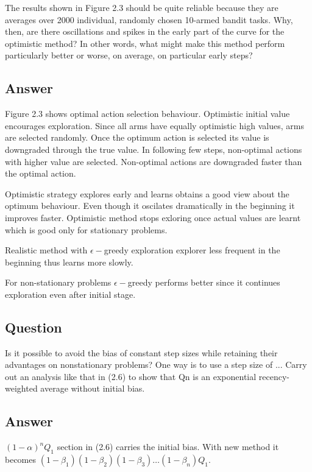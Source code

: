 \documentclass{article}
\begin{document}
    The results shown in Figure 2.3 should be quite reliable because
    they are averages over 2000 individual, randomly chosen 10-armed bandit tasks. Why, then, are there
    oscillations and spikes in the early part of the curve for the optimistic method? In other words, what
    might make this method perform particularly better or worse, on average, on particular early steps?

    \subsection*{Answer}

    Figure 2.3 shows optimal action selection behaviour.
    Optimistic initial value encourages exploration.
    Since all arms have equally optimistic high values, arms are selected randomly.
    Once the optimum action is selected its value is downgraded through the true value.
    In following few steps, non-optimal actions with higher value are selected.
    Non-optimal actions are downgraded faster than the optimal action.

    Optimistic strategy explores early and learns obtains a good view about the optimum behaviour.
    Even though it oscilates dramatically in the beginning it improves faster.
    Optimistic method stops exloring once actual values are learnt which is good only for stationary problems.

    Realistic method with $\epsilon-$greedy exploration explorer less frequent in the beginning thus learns more slowly.

    For non-stationary problems $\epsilon-$greedy performs better since it continues exploration even after initial stage.

    \subsection{Question}
    Is it possible to avoid the bias of constant step sizes while retaining their advantages on nonstationary problems? One way is to use a step size of ...
    Carry out an analysis like that in (2.6) to show that Qn is an exponential recency-weighted average without initial bias.

    \subsection*{Answer}
    $(1-\alpha)^{n}Q_1$ section in (2.6) carries the initial bias.
    With new method it becomes $(1-\beta_1)(1-\beta_2)(1-\beta_3)\ldots(1-\beta_n)Q_1$.
\end{document}
